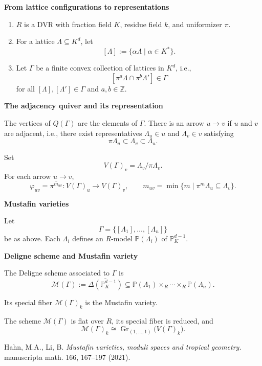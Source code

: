 \medskip\noindent
{\bf From lattice configurations to
representations}

\begin{enumerate}
\item $R$ is a DVR with fraction field
$K$, residue field $k$, and uniformizer
$\pi$.

\item For a lattice $\Lambda\subseteq K^d$,
let
$$
[\Lambda]:=
\{\alpha\Lambda\mid\alpha\in K^*\}.
$$

\item Let $\Gamma$ be a finite convex
collection of lattices in $K^d$, i.e.,
$$
[\pi^a\Lambda\cap\pi^b\Lambda']
\in\Gamma
$$
for all $[\Lambda],[\Lambda']\in\Gamma$
and $a,b\in\mathbb{Z}$.
\end{enumerate}

\medskip\noindent
{\bf The adjacency quiver and its
representation}

The vertices of $Q(\Gamma)$ are the
elements of $\Gamma$. There is an arrow
$u\to v$ if $u$ and $v$ are adjacent,
i.e., there exist representatives
$\Lambda_u\in u$ and $\Lambda_v\in v$
satisfying
$$
\pi\Lambda_u\subset\Lambda_v
\subset\Lambda_u.
$$

Set
$$
V(\Gamma)_v=\Lambda_v/\pi\Lambda_v.
$$
For each arrow $u\to v$,
$$
\varphi_{uv}
=
\overline{\pi^{m_{uv}}}\colon
V(\Gamma)_u\longrightarrow V(\Gamma)_v,
\qquad
m_{uv}
=
\min\{m\mid
\pi^m\Lambda_u\subseteq\Lambda_v\}.
$$

\medskip\noindent
{\bf Mustafin varieties}

Let
$$
\Gamma=
\{[\Lambda_1],\ldots,[\Lambda_n]\}
$$
be as above. Each $\Lambda_i$ defines an
$R$-model $\mathbb{P}(\Lambda_i)$ of
$\mathbb{P}_K^{d-1}$.

\medskip\noindent
{\bf Deligne scheme and Mustafin variety}

The Deligne scheme associated to $\Gamma$
is
$$
\mathcal{M}(\Gamma)
:=
\overline{\Delta(\mathbb{P}_K^{d-1})}
\subseteq
\mathbb{P}(\Lambda_1)
\times_R\cdots\times_R
\mathbb{P}(\Lambda_n).
$$

Its special fiber $\mathcal{M}(\Gamma)_k$
is the Mustafin variety.

The scheme $\mathcal{M}(\Gamma)$ is flat
over $R$, its special fiber is reduced,
and
$$
\boxed{
\mathcal{M}(\Gamma)_k
\cong
\operatorname{Gr}_{(1,\ldots,1)}
\bigl(V(\Gamma)_k\bigr)
}.
$$

Hahn, M.A., Li, B.
{\it Mustafin varieties, moduli spaces and
tropical geometry.}
manuscripta math. 166, 167--197 (2021).

